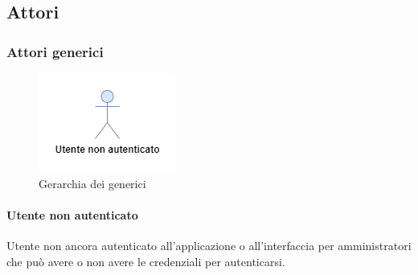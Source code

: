 \subsection{Attori}
\subsubsection{Attori generici}
\begin{figure}[h]
  \centering
    \includegraphics[scale=0.8]{Sezioni/UseCase/Immagini/Generici.png}
    \caption{Gerarchia dei generici}
\end{figure}

\paragraph{Utente non autenticato}
Utente non ancora autenticato all'applicazione o all'interfaccia per amministratori che può avere o non avere le credenziali per autenticarsi.

